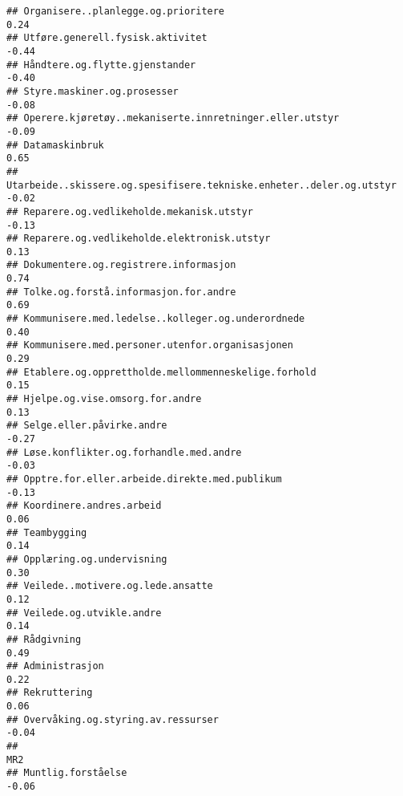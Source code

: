 \documentclass[
]{article}
\begin{document}
\begin{verbatim}
## Organisere..planlegge.og.prioritere                                               0.24
## Utføre.generell.fysisk.aktivitet                                                 -0.44
## Håndtere.og.flytte.gjenstander                                                   -0.40
## Styre.maskiner.og.prosesser                                                      -0.08
## Operere.kjøretøy..mekaniserte.innretninger.eller.utstyr                          -0.09
## Datamaskinbruk                                                                    0.65
## Utarbeide..skissere.og.spesifisere.tekniske.enheter..deler.og.utstyr             -0.02
## Reparere.og.vedlikeholde.mekanisk.utstyr                                         -0.13
## Reparere.og.vedlikeholde.elektronisk.utstyr                                       0.13
## Dokumentere.og.registrere.informasjon                                             0.74
## Tolke.og.forstå.informasjon.for.andre                                             0.69
## Kommunisere.med.ledelse..kolleger.og.underordnede                                 0.40
## Kommunisere.med.personer.utenfor.organisasjonen                                   0.29
## Etablere.og.opprettholde.mellommenneskelige.forhold                               0.15
## Hjelpe.og.vise.omsorg.for.andre                                                   0.13
## Selge.eller.påvirke.andre                                                        -0.27
## Løse.konflikter.og.forhandle.med.andre                                           -0.03
## Opptre.for.eller.arbeide.direkte.med.publikum                                    -0.13
## Koordinere.andres.arbeid                                                          0.06
## Teambygging                                                                       0.14
## Opplæring.og.undervisning                                                         0.30
## Veilede..motivere.og.lede.ansatte                                                 0.12
## Veilede.og.utvikle.andre                                                          0.14
## Rådgivning                                                                        0.49
## Administrasjon                                                                    0.22
## Rekruttering                                                                      0.06
## Overvåking.og.styring.av.ressurser                                               -0.04
##                                                                                    MR2
## Muntlig.forståelse                                                               -0.06

\end{verbatim}
\end{document}
